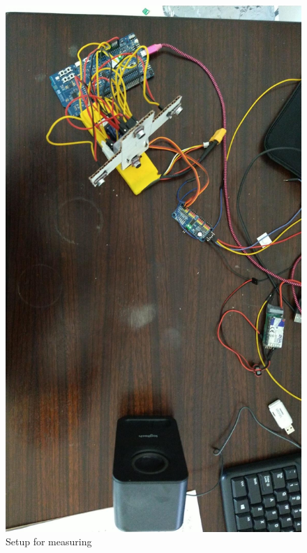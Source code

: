 \documentclass[a4paper]{article}
\begin{document}
\begin{figure}
    \begin{center}
        \includegraphics[angle=90,width=\linewidth]{assets/test_setup.jpeg}
        \caption{Setup for measuring}
        \label{fig:test_setup}
    \end{center}
\end{figure}
\end{document}
